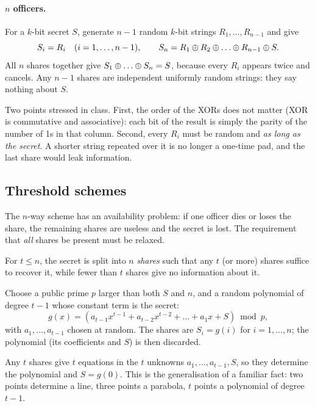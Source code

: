 \paragraph{$n$ officers.} For a $k$-bit secret $S$, generate $n-1$ random $k$-bit strings $R_1, \dots, R_{n-1}$ and give
\[
    S_i = R_i \quad (i = 1, \dots, n-1), \qquad S_n = R_1 \xor R_2 \xor \dots \xor R_{n-1} \xor S.
\]
All $n$ shares together give $S_1 \xor \dots \xor S_n = S$, because every $R_i$ appears twice and cancels. Any $n-1$ shares are independent uniformly random strings: they say nothing about $S$.

Two points stressed in class. First, the order of the XORs does not matter (XOR is commutative and associative): each bit of the result is simply the parity of the number of 1s in that column. Second, every $R_i$ must be random and \emph{as long as the secret}. A shorter string repeated over it is no longer a one-time pad, and the last share would leak information.

\subsection{Threshold schemes}

The $n$-way scheme has an availability problem: if one officer dies or loses the share, the remaining shares are useless and the secret is lost. The requirement that \emph{all} shares be present must be relaxed.

\begin{definition}
For $t \le n$, the secret is split into $n$ \emph{shares} such that any $t$ (or more) shares suffice to recover it, while fewer than $t$ shares give no information about it.
\end{definition}

\begin{definition}
Choose a public prime $p$ larger than both $S$ and $n$, and a random polynomial of degree $t-1$ whose constant term is the secret:
\[
    g(x) = (a_{t-1} x^{t-1} + a_{t-2} x^{t-2} + \dots + a_1 x + S) \bmod p,
\]
with $a_1, \dots, a_{t-1}$ chosen at random. The shares are $S_i = g(i)$ for $i = 1, \dots, n$; the polynomial (its coefficients and $S$) is then discarded.
\end{definition}

Any $t$ shares give $t$ equations in the $t$ unknowns $a_1, \dots, a_{t-1}, S$, so they determine the polynomial and $S = g(0)$. This is the generalisation of a familiar fact: two points determine a line, three points a parabola, $t$ points a polynomial of degree $t-1$.

